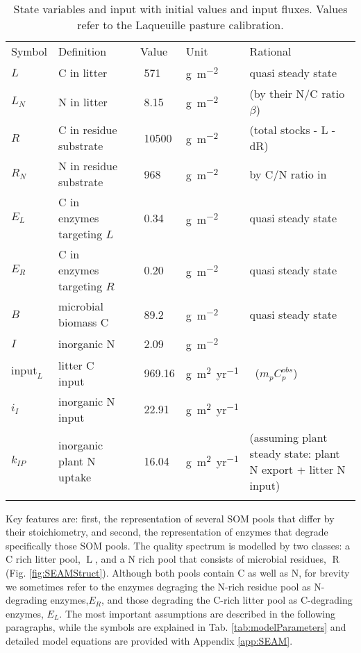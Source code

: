 \begin{table*}[t]
\caption{
\label{tab:modelStates}
State variables and input with initial values and input fluxes. Values refer to the Laqueuille pasture calibration. }
\begin{tabular}{lp{4cm}lllp{5.5cm}}
\tophline
Symbol &  Definition & \multicolumn{2}{c}{Value} & Unit & Rational \\
\middlehline
$L$ &  C in litter & & 571 & \unit{g~m^{-2}} & quasi steady state 
\\
$L_N$ &  N in litter & & 8.15 & \unit{g~m^{-2}} & \citep{Perveen14}
(by their N/C ratio $\beta$)
\\
$R$ &  C in residue substrate & & 10500 & \unit{g~m^{-2}} &
\citep{Allard07} (total stocks - L - dR)
\\
$R_N$ &  N in residue substrate & & 968 & \unit{g~m^{-2}} & by C/N
ratio in \citep{Perveen14} \\
$E_L$ &  C in enzymes targeting $L$ & & 0.34 & \unit{g~m^{-2}} & 
quasi steady state \\
$E_R$ &  C in enzymes targeting $R$ & & 0.20 & \unit{g~m^{-2}} & 
quasi steady state \\
$B$ & microbial biomass C & & 89.2 & \unit{g~m^{-2}} &  quasi steady
state \\
$I$ & inorganic N & & 2.09 & \unit{g~m^{-2}} & \citep{Perveen14} \\
\middlehline
$\mathrm{input}_{L}$ & litter C input & & 969.16 &
\unit{g~m^2yr^{-1}} & \citep{Perveen14} \, ($m_p C^{obs}_p$)\\
$i_{I}$ & inorganic N input & & 22.91 & \unit{g~m^2yr^{-1}} 
& \citep{Perveen14} \\
$k_{IP}$ & inorganic plant N uptake & & 16.04 & 
\unit{g~m^2yr^{-1}} & \citep{Perveen14} (assuming plant
steady state: plant N export + litter N input)\\
\bottomhline
\end{tabular}
\end{table*}

Key features are: first, the representation of several SOM pools that differ by
their stoichiometry, and second, the representation of enzymes that
degrade specifically those SOM pools. The quality spectrum is modelled by two
classes:
a C rich litter pool, $\operatorname{L}$, and a N rich pool that consists of
microbial residues, $\operatorname{R}$ (Fig. \ref{fig:SEAMStruct}). Although
both pools contain C as well as N, for brevity we sometimes refer to the enzymes
degraging the N-rich residue pool as N-degrading enzymes,$E_R$, and those
degrading the C-rich litter pool as C-degrading enzymes, $E_L$. The most
important assumptions are described in the following paragraphs, while the symbols are
explained in Tab. \ref{tab:modelParameters} and detailed model equations are
provided with Appendix \ref{app:SEAM}.

